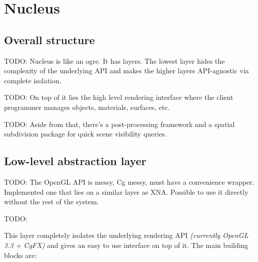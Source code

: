 
\chapter{ Nucleus }
\label{Chapter4}

\section{Overall structure}

TODO: Nucleus is like an ogre. It has layers. The lowest layer hides the complexity of the underlying API and makes the higher layers API-agnostic via complete isolation.

TODO: On top of it lies the high level rendering interface where the client programmer manages objects, materials, surfaces, etc.

TODO: Aside from that, there's a post-processing framework and a spatial subdivision package for quick scene visibility queries.

\section{Low-level abstraction layer}

TODO: The OpenGL API is messy, Cg messy, must have a convenience wrapper. Implemented one that lies on a similar layer as XNA. Possible to use it directly without the rest of the system.

TODO:
	
This layer completely isolates the underlying rendering API \emph{(currently OpenGL 3.3 + CgFX)} and gives an easy to use interface on top of it. The main building blocks are:
	
